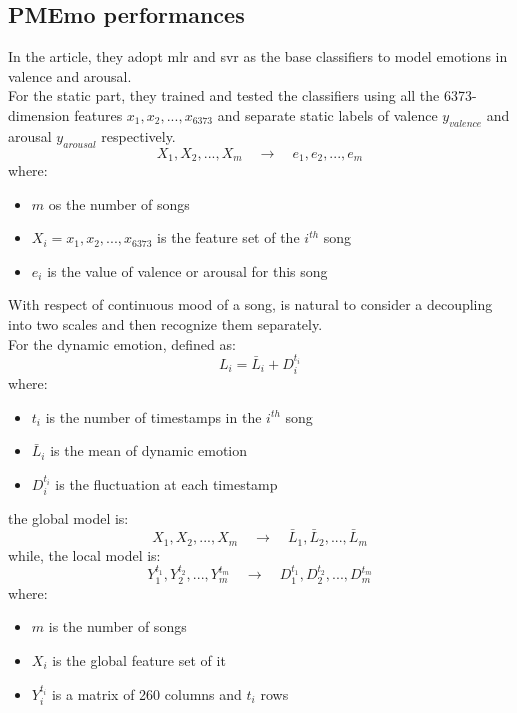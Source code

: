 \subsection{PMEmo performances}
In the article, they adopt \gls{mlr} and \gls{svr} as the base classifiers to model emotions in valence and arousal.
\\
For the static part, they trained and tested the classifiers using all the 6373-dimension features $x_1,x_2,...,x_{6373}$ and separate static labels of valence $y_{valence}$ and arousal $y_{arousal}$ respectively.
\begin{equation}
	{X_1,X_2,...,X_m} \quad \rightarrow \quad {e_1,e_2,...,e_m}
\end{equation}
where:
\begin{itemize}
	\item $m$ os the number of songs
	\item $X_i={x_1,x_2,...,x_{6373}}$ is the feature set of the $i^{th}$ song
	\item $e_i$ is the value of valence or arousal for this song
\end{itemize}
With respect of continuous mood of a song, is natural to consider a decoupling into two scales and then recognize them separately.
\\
For the dynamic emotion, defined as:
\begin{equation}
	L_i=\bar{L}_i+D_i^{t_i}
\end{equation}
where:
\begin{itemize}
	\item $t_i$ is the number of timestamps in the $i^{th}$ song
	\item $\bar{L}_i$ is the mean of dynamic emotion
	\item $D_i^{t_i}$ is the fluctuation at each timestamp
\end{itemize}
the global model is:
\begin{equation}
	{X_1,X_2,...,X_m} \quad \rightarrow \quad {\bar{L}_1,\bar{L}_2,...,\bar{L}_m}
\end{equation}
while, the local model is:
\begin{equation}
	{Y_1^{t_1},Y_2^{t_2},...,Y_m^{t_m}} \quad \rightarrow \quad {D_1^{t_1},D_2^{t_2},...,D_m^{t_m}}
\end{equation}
where:
\begin{itemize}
	\item $m$ is the number of songs
	\item $X_i$ is the global feature set of it
	\item $Y_i^{t_i}$ is a matrix of 260 columns and $t_i$ rows
\end{itemize}
